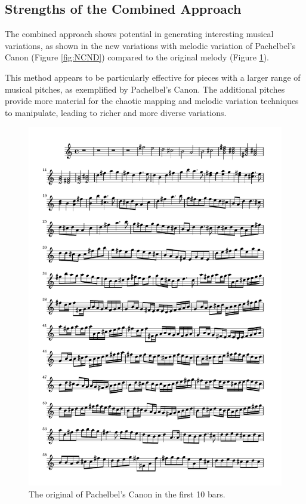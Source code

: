 \documentclass[11pt]{article}
\begin{document}
\subsection{Strengths of the Combined Approach}

The combined approach shows potential in generating interesting musical variations, as shown in the new variations with melodic variation of Pachelbel's Canon \cite{pachelbel_canon_2005} (Figure \ref{fig:NCND}) compared to the original melody (Figure \ref{fig:OCND}).

This method appears to be particularly effective for pieces with a larger range of musical pitches, as exemplified by Pachelbel's Canon. The additional pitches provide more material for the chaotic mapping and melodic variation techniques to manipulate, leading to richer and more diverse variations.

\begin{figure}
\centering
\includegraphics[trim=1cm 26.5cm 1cm 0.5cm, clip, scale=0.6]{Original_CND.pdf}
\caption{The original of Pachelbel's Canon in the first 10 bars.} 
\label{fig:OCND}
\end{figure}
\end{document}
